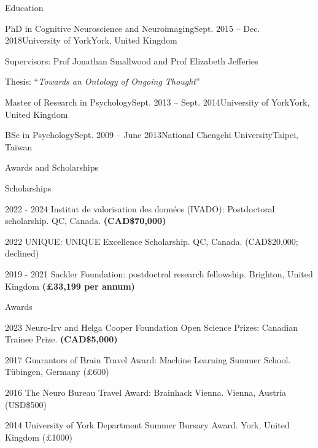 \documentclass{resume} %
\begin{document}

\begin{rSection}{Education}

  \begin{rSubsection}{PhD in Cognitive Neuroscience and Neuroimaging}{Sept. 2015 -- Dec. 2018}{University of York}{York, United Kingdom}
    \item Supervisors: Prof Jonathan Smallwood and Prof Elizabeth Jefferies
    \item Thesis: ``\textit{Towards an Ontology of Ongoing Thought}''
  \end{rSubsection}

  \begin{EDUrSubsection}{Master of Research in Psychology}{Sept. 2013 -- Sept. 2014}{University of York}{York, United Kingdom}
  \end{EDUrSubsection}

  \begin{EDUrSubsection}{BSc in Psychology}{Sept. 2009 -- June 2013}{National Chengchi University}{Taipei, Taiwan}
  \end{EDUrSubsection}
\end{rSection}



\begin{rSection}{Awards and Scholarships}
  
  \begin{rSubsection}{Scholarships}{}{}{}
    \item 2022 - 2024 Institut de valorisation des données (IVADO): Postdoctoral scholarship. QC, Canada. \textbf{(CAD\$70,000)}
    \item 2022 UNIQUE: UNIQUE Excellence Scholarship. QC, Canada. (CAD\$20,000; declined)
    \item 2019 - 2021 Sackler Foundation: postdoctral research fellowship. Brighton, United Kingdom \textbf{(\pounds 33,199 per annum)}
  \end{rSubsection}
  
  \begin{rSubsection}{Awards}{}{}{}
  	\item 2023 Neuro-Irv and Helga Cooper Foundation Open Science Prizes: Canadian Trainee Prize. \textbf{(CAD\$5,000)}
    \item 2017 Guarantors of Brain Travel Award: Machine Learning Summer School. T\"{u}bingen, Germany (\pounds 600)
    \item 2016 The Neuro Bureau Travel Award: Brainhack Vienna. Vienna, Austria (USD\$500)
    \item 2014 University of York Department Summer Bursary Award. York, United Kingdom (\pounds 1000)
  \end{rSubsection}

\end{rSection}
\pagebreak
\end{document}
